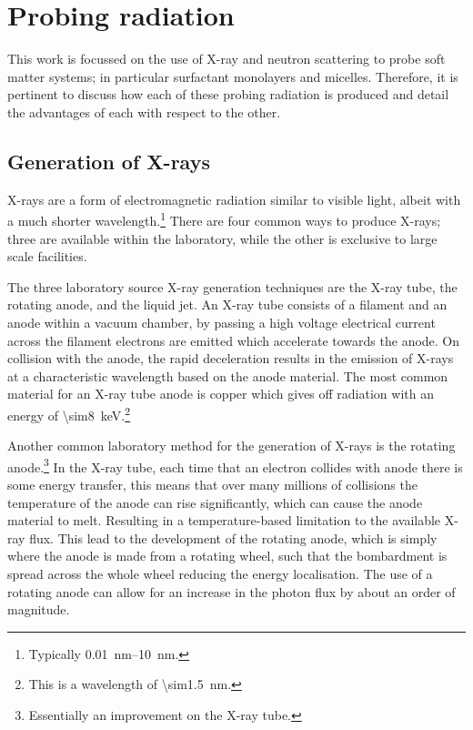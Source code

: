 \section{Probing radiation}
This work is focussed on the use of X-ray and neutron scattering to probe soft matter systems; in particular surfactant monolayers and micelles. Therefore, it is pertinent to discuss how each of these probing radiation is produced and detail the advantages of each with respect to the other.

\subsection{Generation of X-rays}
X-rays are a form of electromagnetic radiation similar to visible light, albeit with a much shorter wavelength.\footnote{Typically \SIrange{0.01}{10}{\nano\meter}.}
There are four common ways to produce X-rays; three are available within the laboratory, while the other is exclusive to large scale facilities.

The three laboratory source X-ray generation techniques are the X-ray tube, the rotating anode, and the liquid jet.
An X-ray tube consists of a filament and an anode within a vacuum chamber, by passing a high voltage electrical current across the filament electrons are emitted which accelerate towards the anode.
On collision with the anode, the rapid deceleration results in the emission of X-rays at a characteristic wavelength based on the anode material.\autocite{schnablegger_saxs_2017}
The most common material for an X-ray tube anode is copper which gives off radiation with an energy of \SI{\sim8}{\kilo\eV}.\footnote{This is a wavelength of \SI{\sim1.5}{\nano\meter}.}

Another common laboratory method for the generation of X-rays is the rotating anode.\footnote{Essentially an improvement on the X-ray tube.}
In the X-ray tube, each time that an electron collides with anode there is some energy transfer, this means that over many millions of collisions the temperature of the anode can rise significantly, which can cause the anode material to melt.
Resulting in a temperature-based limitation to the available X-ray flux.
This lead to the development of the rotating anode, which is simply where the anode is made from a rotating wheel, such that the bombardment is spread across the whole wheel reducing the energy localisation.
The use of a rotating anode can allow for an increase in the photon flux by about an order of magnitude.\autocite{schnablegger_saxs_2017}

